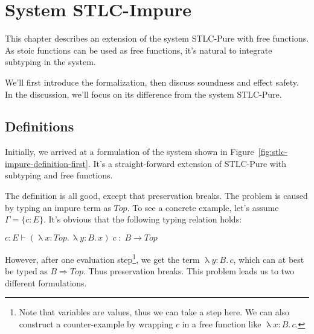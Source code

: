 \section{System STLC-Impure}

This chapter describes an extension of the system STLC-Pure with free
functions. As stoic functions can be used as free functions, it's
natural to integrate subtyping in the system.

We'll first introduce the formalization, then discuss soundness and
effect safety. In the discussion, we'll focus on its difference from
the system STLC-Pure.

\subsection{Definitions}

Initially, we arrived at a formulation of the system shown in
Figure~\ref{fig:stlc-impure-definition-first}. It's a straight-forward
extension of STLC-Pure with subtyping and free functions.

The definition is all good, except that preservation breaks. The
problem is caused by typing an impure term as $Top$. To see a concrete
example, let's assume $\Gamma = \{c:E\}$. It's obvious that the
following typing relation holds:

\begin{center}
  $c:E \vdash (\uplambda x{:}Top. \, \uplambda y{:}B. \, x) \; c \; : \; B \to Top$
\end{center}

However, after one evaluation step\footnote{Note that variables are
  values, thus we can take a step here. We can also construct a
  counter-example by wrapping $c$ in a free function like
  $\uplambda x{:}B.\, c$.}, we get the term $\uplambda y{:}B. \, c$,
which can at best be typed as $B \Rightarrow Top$. Thus preservation
breaks. This problem leads us to two different formulations.

